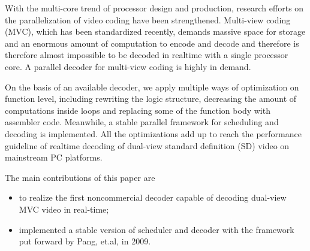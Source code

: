 \begin{eabstract} 

With the multi-core trend of processor design and production, research efforts on the parallelization of video coding have been strengthened. Multi-view coding (MVC), which has been standardized recently, demands massive space for storage and an enormous amount of computation to encode and decode and therefore is therefore almost impossible to be decoded in realtime with a single processor core. A parallel decoder for multi-view coding is highly in demand.

On the basis of an available decoder, we apply multiple ways of optimization on function level, including rewriting the logic structure, decreasing the amount of computations inside loops and replacing some of the function body with assembler code. Meanwhile, a stable parallel framework for scheduling and decoding is implemented. All the optimizations add up to reach the performance guideline of realtime decoding of dual-view standard definition (SD) video on mainstream PC platforms.

The main contributions of this paper are
\begin{itemize}
\item to realize the first noncommercial decoder capable of decoding dual-view MVC video in real-time;
\item implemented a stable version of scheduler and decoder with the framework\cite{pang2009framework} put forward by Pang, et.al, in 2009.
\end{itemize}

\end{eabstract}


